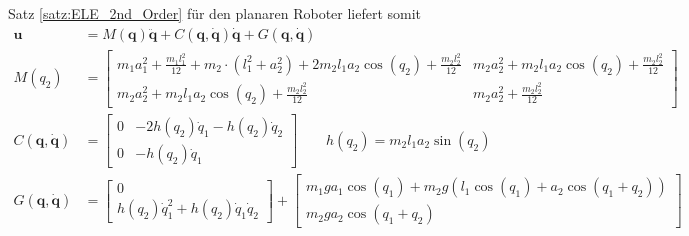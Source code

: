 \documentclass[a4paper, 12pt]{scrartcl}
\begin{document}
Satz \ref{satz:ELE_2nd_Order} für den planaren Roboter liefert somit 
%
\begin{align*}
    \bm{u}
    &=
    M(\bm{q}) 
    \bm{\ddot{q}}
    +
    C(\bm{q}, \bm{\dot{q}}) 
    \bm{\dot{q}}
    +
    G(\bm{q},\bm{\dot{q}})
    \\
    M(q_2)
    &=
    \begin{bmatrix}
        m_1 a_1^2 + \frac{m_1 l_1^2}{12} 
        + 
        m_2 \cdot (l_1^2 + a_2^2) + 2m_2 l_1 a_2 \cos(q_2) 
        + 
        \frac{m_2 l_2^2}{12}
        & 
        m_2 a_2^2 + m_2 l_1 a_2 \cos(q_2) 
        +
        \frac{m_2 l_2^2}{12}
        \\
        m_2 a_2^2 + m_2 l_1 a_2 \cos(q_2) 
        + 
        \frac{m_2 l_2^2}{12}
        & 
        m_2 a_2^2 
        +
        \frac{m_2 l_2^2}{12}
    \end{bmatrix}
    \\
    C(\bm{q},\bm{\dot{q}})
    &=
    \begin{bmatrix}
        0
        &
        - 2h(q_2) \dot{q}_1 
        - h(q_2) \dot{q}_2
        \\
        0
        &
        -h(q_2) \dot{q}_1
    \end{bmatrix}
    \qquad
    h(q_2)
    =
    m_2 l_1 a_2 \sin(q_2) 
    \\
    G(\bm{q}, \bm{\dot{q}})
    &=
    \begin{bmatrix}
        0 \\
        h(q_2) \dot{q}_1^2 + h(q_2) \dot{q}_1 \dot{q}_2 
    \end{bmatrix}
    +
    \begin{bmatrix}
        m_1  g  a_1 \cos(q_1) + m_2  g 
        \left( 
            l_1 \cos(q_1) + a_2 \cos(q_1 + q_2) 
        \right) 
        \\
        m_2  g a_2 \cos(q_1+q_2) 
    \end{bmatrix}
\end{align*}
\end{document}

